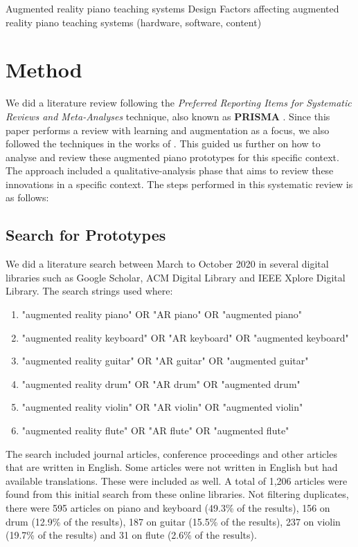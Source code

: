\documentclass[sigchi, review]{acmart}
\begin{document}
Augmented reality piano teaching systems
Design Factors affecting augmented reality piano teaching systems (hardware, software, content)

\section{Method}
\label{sec: method}
We did a literature review following the \textit{Preferred Reporting Items for Systematic Reviews and Meta-Analyses} technique, also known as \textbf{PRISMA} \cite{moher2009preferred}. Since this paper performs a review with learning and augmentation as a focus, we also followed the techniques in the works of \cite{santos2013augmented, schneegass2016mobile, kljun2015transference, blattgerste2019augmented, mcpherson2015buttons, delgado2011state}.  This guided us further on how to analyse and review these augmented piano prototypes for this specific context. The approach included a  qualitative-analysis phase that aims to review these innovations in a specific context. The steps performed in this systematic review is as follows: 

\subsection{Search for Prototypes}
\label{subsec: search}
We did a literature search between March to October 2020 in several digital libraries such as Google Scholar, ACM Digital Library and IEEE Xplore Digital Library. The search strings used where:
\begin{enumerate}
    \item "augmented reality piano" OR "AR piano" OR "augmented piano" 
    \item "augmented reality keyboard" OR "AR keyboard" OR "augmented keyboard"
    \item "augmented reality guitar" OR "AR guitar" OR "augmented guitar"
    \item "augmented reality drum" OR "AR drum" OR "augmented drum"
    \item "augmented reality violin" OR "AR violin" OR "augmented violin"
    \item "augmented reality flute" OR "AR flute" OR "augmented flute"
\end{enumerate}
The search included journal articles, conference proceedings and other articles that are written in English. Some articles were not written in English but had available translations. These were included as well. A total of 1,206 articles were found from this initial search from these online libraries. Not filtering duplicates, there were 595 articles on piano and keyboard (49.3\% of the results), 156 on drum (12.9\% of the results), 187 on guitar (15.5\% of the results), 237 on violin (19.7\% of the results) and 31 on flute (2.6\% of the results). 
\end{document}
